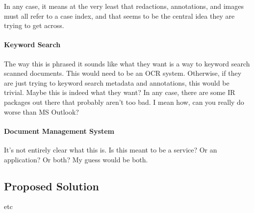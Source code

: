 In any case, it means at the very least that redactions, annotations, and
images must all refer to a case index, and that seems to be the central idea
they are trying to get across.

\paragraph{Keyword Search}The way this is phrased it sounds like what they want
is a way to keyword search scanned documents.  This would need to be an OCR
system.  Otherwise, if they are just trying to keyword search metadata and
annotations, this would be trivial.  Maybe this is indeed what they want?  In
any case, there are some IR packages out there that probably aren't too bad.  I
mean how, can you really do worse than MS Outlook?

\paragraph{Document Management System}It's not entirely clear what this is.  Is
this meant to be a service?  Or an application?  Or both?  My guess would be
both.

\subsection{Proposed Solution}
etc
